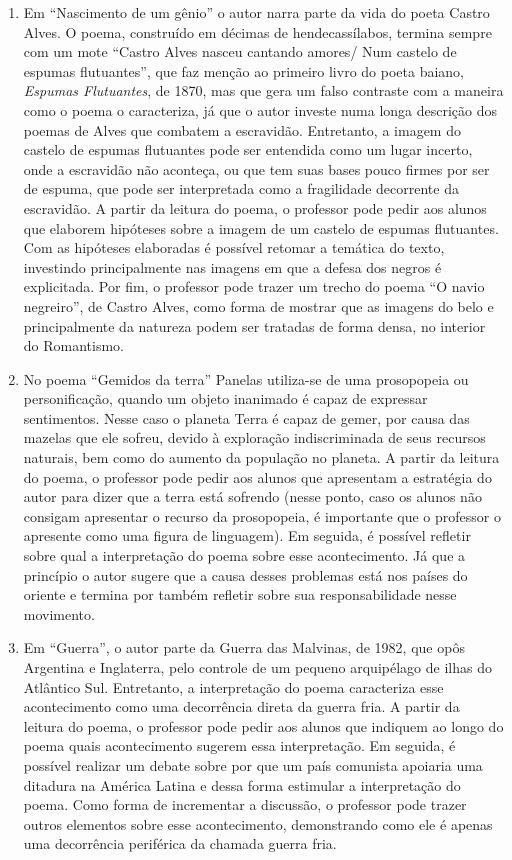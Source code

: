 \begin{enumerate}
\item Em ``Nascimento de um gênio'' o
autor narra parte da vida do poeta Castro Alves. O poema, construído em
décimas de hendecassílabos, termina sempre com um mote
``Castro Alves nasceu cantando amores/ Num castelo de
espumas flutuantes'', que faz menção ao primeiro
livro do poeta baiano, \textit{Espumas Flutuantes}, de 1870, mas que gera um falso
contraste com a maneira como o poema o caracteriza, já que o autor
investe numa longa descrição dos poemas de Alves que combatem a
escravidão. Entretanto, a imagem do castelo de espumas flutuantes pode
ser entendida como um lugar incerto, onde a escravidão não aconteça, ou que
tem suas bases pouco firmes por ser de espuma, que pode ser interpretada como
a fragilidade decorrente da escravidão. A partir da leitura do poema, o
professor pode pedir aos alunos que elaborem hipóteses sobre a imagem
de um castelo de espumas flutuantes. Com as hipóteses elaboradas é
possível retomar a temática do texto, investindo principalmente nas
imagens em que a defesa dos negros é explicitada. Por fim, o professor
pode trazer um trecho do poema ``O navio
negreiro'', de Castro Alves, como forma de mostrar
que as imagens do belo e principalmente da natureza podem ser tratadas
de forma densa, no interior do Romantismo.

\item No poema ``Gemidos da terra''
Panelas utiliza-se de uma prosopopeia ou personificação, quando um
objeto inanimado é capaz de expressar sentimentos. Nesse caso o planeta
Terra é capaz de gemer, por causa das mazelas que ele sofreu, devido à
exploração indiscriminada de seus recursos naturais, bem como do
aumento da população no planeta. A partir da leitura do poema, o
professor pode pedir aos alunos que apresentam a estratégia do autor
para dizer que a terra está sofrendo (nesse ponto, caso os alunos
não consigam apresentar o recurso da prosopopeia, é importante que o
professor o apresente como uma figura de linguagem). Em seguida, é
possível refletir sobre qual a interpretação do poema sobre esse
acontecimento. Já que a princípio o autor sugere que a causa desses
problemas está nos países do oriente e termina por também refletir
sobre sua responsabilidade nesse movimento.  

\item Em ``Guerra'', o autor parte da
Guerra das Malvinas, de 1982, que opôs Argentina e Inglaterra, pelo
controle de um pequeno arquipélago de ilhas do Atlântico Sul.
Entretanto, a interpretação do poema caracteriza esse acontecimento
como uma decorrência direta da guerra fria. A partir da leitura do
poema, o professor pode pedir aos alunos que indiquem ao longo do
poema quais acontecimento sugerem essa interpretação. Em seguida, é
possível realizar um debate sobre por que um país comunista apoiaria uma
ditadura na América Latina e dessa forma estimular a interpretação do
poema. Como forma de incrementar a discussão, o professor pode trazer
outros elementos sobre esse acontecimento, demonstrando como ele é
apenas uma decorrência periférica da chamada guerra fria.


\end{enumerate}

